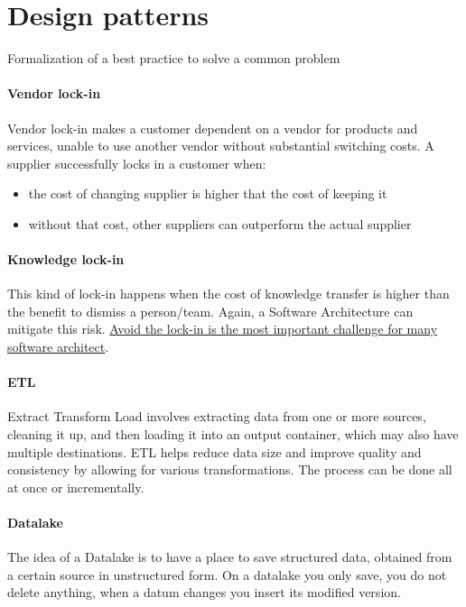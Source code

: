 \section{Design patterns}
\begin{definition}
Formalization of a best practice to solve a common
problem
\end{definition}

\paragraph{Vendor lock-in}
Vendor lock-in makes a customer dependent on a vendor
for products and services, unable to use another vendor without substantial switching costs. A supplier successfully locks in a customer when:
\begin{itemize}
    \item the cost of changing supplier is higher that the cost of keeping it
    \item without that cost, other suppliers can outperform the actual supplier
\end{itemize}

\paragraph{Knowledge lock-in}
This kind of lock-in happens when the cost of knowledge transfer is higher than the benefit to dismiss a person/team. Again, a Software Architecture can mitigate this risk.
\uline{Avoid the lock-in is the most important challenge for many software architect}.

\paragraph{ETL}
Extract Transform Load involves extracting data from one or more sources, cleaning it up, and then loading it into an output container, which may also have multiple destinations. ETL helps reduce data size and improve quality and consistency by allowing for various transformations. The process can be done all at once or incrementally.

\paragraph{Datalake}
The idea of a Datalake is to have a place to save structured data, obtained from a certain source in unstructured form. On a datalake you only save, you do not delete anything, when a datum changes you insert its modified version. 
    
